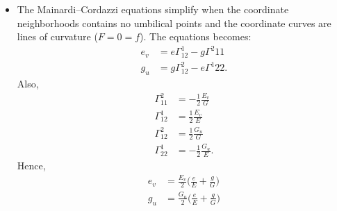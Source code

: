 \documentclass[10pt]{article}
\newtheorem{theorem}[lemma]{Theorem}
\newcommand{\ve}[1]{\mathbf{#1}}
\newcommand{\ra}{\rightarrow}
\newcommand{\Real}{\mathbb{R}}
\begin{document}
\begin{itemize}
\begin{theorem}[Bonnet]
      Furthermore, if $U$ is connected and if $\bar{\ve{x}}: U \ra \Real^3$ is another diffeomorphism satisfying the same conditions, then there exists a translation $T$ and a proper linear orthogonal transformation $\rho$ in $\Real^3$ such that $\ve{x} = T \circ \rho \circ \ve{x}$. (In other words, the coefficients of the first and second fundamental forms determine the surface up to a rigid motion.)
    \end{theorem}

    \item The Mainardi--Cordazzi equations simplify when the coordinate neighborhoods contains no umbilical points and the coordinate curves are lines of curvature ($F = 0 = f$). The equations becomes:
    \begin{align*}
      e_v &= e \Gamma^1_{12} - g\Gamma^2{11}\\
      g_u &= g \Gamma^2_{12} - e\Gamma^1{22}.
    \end{align*}
    Also,
    \begin{align*}
      \Gamma_{11}^2 &= -\frac{1}{2}\frac{E_v}{G}\\
      \Gamma_{12}^1 &= \frac{1}{2}\frac{E_v}{E}\\
      \Gamma_{12}^2 &= \frac{1}{2}\frac{G_u}{G}\\
      \Gamma_{22}^1 &= -\frac{1}{2}\frac{G_u}{E}.
    \end{align*}
    Hence,
    \begin{align*}
      e_v &= \frac{E_v}{2}\bigg( \frac{e}{E} + \frac{g}{G} \bigg)\\
      g_u &= \frac{G_u}{2}\bigg( \frac{e}{E} + \frac{g}{G} \bigg)
    \end{align*}
  \end{itemize}
 
\end{document}
